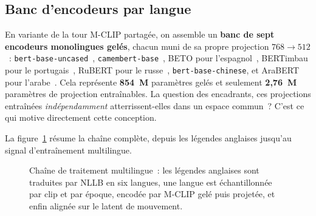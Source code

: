 \documentclass[12pt,a4paper,oneside]{report}
\theoremstyle{definition}
\theoremstyle{plain}
\begin{document}
\subsection{Banc d'encodeurs par langue}
En variante de la tour M-CLIP partagée, on assemble un \textbf{banc de sept
encodeurs monolingues gelés}, chacun muni de sa propre projection $768\rightarrow512$~:
\texttt{bert-base-uncased}~\cite{devlin2019bert},
\texttt{camembert-base}~\cite{martin2020camembert}, BETO pour
l'espagnol~\cite{canete2020beto}, BERTimbau pour le
portugais~\cite{souza2020bertimbau}, RuBERT pour le russe~\cite{kuratov2019rubert},
\texttt{bert-base-chinese}, et AraBERT pour l'arabe~\cite{antoun2020arabert}. Cela
représente \textbf{854~M} paramètres gelés et seulement \textbf{2,76~M} paramètres
de projection entraînables. La question des encadrants, ces projections
entraînées \emph{indépendamment} atterrissent-elles dans un espace commun~?
C'est ce qui motive directement cette conception.

La figure~\ref{fig:pipeline} résume la chaîne complète, depuis les légendes
anglaises jusqu'au signal d'entraînement multilingue.

\begin{figure}[ht]
\centering
{}
\caption{Chaîne de traitement multilingue~: les légendes anglaises sont traduites
par NLLB en six langues, une langue est échantillonnée par clip et par époque,
encodée par M-CLIP gelé puis projetée, et enfin alignée sur le latent de mouvement.}
\label{fig:pipeline}
\end{figure}
\end{document}
